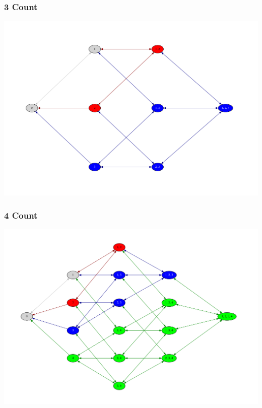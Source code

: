 \documentclass[10pt]{beamer}
\begin{document}
\begin{frame}
  \frametitle{3 Count}
  \centering

  \includegraphics[width=\textwidth]{timed_automata/count3.pdf}
\end{frame}

\begin{frame}
  \frametitle{4 Count}
  \centering

  \includegraphics[width=\textwidth]{timed_automata/count4.pdf}
\end{frame}

{\aauwavesbg
\begin{frame}
\end{frame}}
\end{document}
